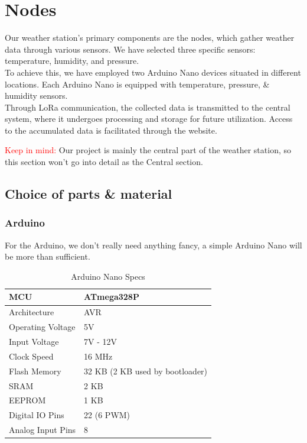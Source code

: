 \section{Nodes}
Our weather station's primary components are the nodes, which gather weather data through various sensors. We have selected three specific sensors: temperature, humidity, and pressure.\\
To achieve this, we have employed two Arduino Nano devices situated in different locations. Each Arduino Nano is equipped with temperature, pressure, \& humidity sensors. \\ Through LoRa communication, the collected data is transmitted to the central system, where it undergoes processing and storage for future utilization. Access to the accumulated data is facilitated through the website.


\textcolor{red}{Keep in mind:}
Our project is mainly the central part of the weather station, so this section won't go into detail as the Central section.

\subsection{Choice of parts \& material}

\subsubsection{Arduino}
For the Arduino, we don't really need anything fancy, a simple Arduino Nano will be more than sufficient.
\begin{table}[H]
    \centering
    \begin{tabular}{|l|l|}
        \hline
        \textbf{MCU} & \textbf{ATmega328P} \\ \hline
        Architecture & AVR \\ \hline
        Operating Voltage & 5V \\ \hline
        Input Voltage & 7V - 12V \\ \hline
        Clock Speed & 16 MHz \\ \hline
        Flash Memory & 32 KB (2 KB used by bootloader) \\ \hline
        SRAM & 2 KB \\ \hline
        EEPROM & 1 KB \\ \hline
        Digital IO Pins & 22 (6 PWM) \\ \hline
        Analog Input Pins & 8 \\ \hline
    \end{tabular}
    \caption{Arduino Nano Specs}
\end{table}

